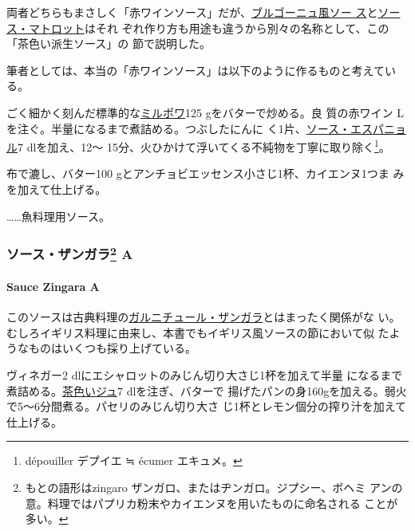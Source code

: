 \begin{recette}
両者どちらもまさしく「赤ワインソース」だが、\protect\hyperlink{sauce-bourguignonne}{ブルゴーニュ風ソー
ス}と\protect\hyperlink{sauce-matelote}{ソース・マトロット}はそれ
ぞれ作り方も用途も違うから別々の名称として、この「茶色い派生ソース」の
節で説明した。

筆者としては、本当の「赤ワインソース」は以下のように作るものと考えてい
る。

ごく細かく刻んだ標準的な\protect\hyperlink{mirepoix}{ミルポワ}125
gをバターで炒める。良 質の赤ワイン\undemi{}
Lを注ぐ。半量になるまで煮詰める。つぶしたにんに
く1片、\protect\hyperlink{sauce-espagnole}{ソース・エスパニョル}7\undemi{}
dlを加え、12〜
15分、火ひかけて浮いてくる不純物を丁寧に取り除く\footnote{dépouiller
  デプイエ ≒ écumer エキュメ。}。

布で漉し、バター100 gとアンチョビエッセンス小さじ1杯、カイエンヌ1つま
みを加えて仕上げる。

\ldots{}\ldots{}魚料理用ソース。

\maeaki

\hypertarget{ux30bdux30fcux30b9ux30b6ux30f3ux30acux30e997-a}{%
\subsubsection[ソース・ザンガラ
A]{\texorpdfstring{ソース・ザンガラ\footnote{もとの語形はzingaro
  ザンガロ、またはヂンガロ。ジプシー、ボヘミ
  アンの意。料理ではパプリカ粉末やカイエンヌを用いたものに命名される
  ことが多い。}
A}{ソース・ザンガラ A}}\label{ux30bdux30fcux30b9ux30b6ux30f3ux30acux30e997-a}}

\hypertarget{sauce-zingara-a}{%
\paragraph{Sauce Zingara A}\label{sauce-zingara-a}}

   

このソースは古典料理の\protect\hyperlink{}{ガルニチュール・ザンガラ}とはまったく関係がな
い。むしろイギリス料理に由来し、本書でもイギリス風ソースの節において似
たようなものはいくつも採り上げている。

ヴィネガー2\undemi{} dlにエシャロットのみじん切り大さじ1杯を加えて半量
になるまで煮詰める。\protect\hyperlink{jus-de-veau-lie}{茶色いジュ}7
dlを注ぎ、バターで
揚げたパンの身160gを加える。弱火で5〜6分間煮る。パセリのみじん切り大さ
じ1杯とレモン\undemi{}個分の搾り汁を加えて仕上げる。


\end{recette}
